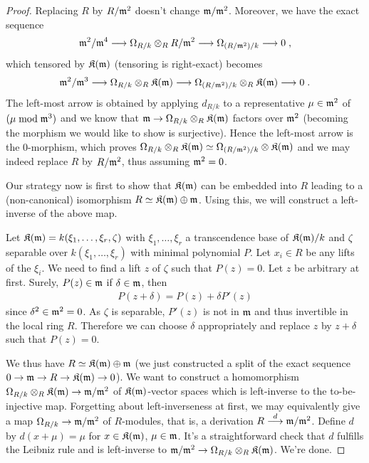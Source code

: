 \documentclass[a4paper,parskip=half,numbers=enddot, DIV=12]{scrreprt}
\begin{document}
\begin{proof}
	Replacing $R$ by $R/\mathfrak{m}^2$ doesn't change $\mathfrak{m}/\mathfrak{m}^2$. Moreover, we have the exact sequence
	\begin{align*}
		\mm^2/\mm^4\morphism\Omega_{R/k}\otimes_R R/\mm^2\morphism\Omega_{(R/\mm^2)/k}\morphism 0\;,
	\end{align*}
	which tensored by $\mathfrak{K}(\mathfrak{m})$ (tensoring is right-exact) becomes
	\begin{align*}
		\mm^2/\mm^3\morphism\Omega_{R/k}\otimes_R \KK(\mm)\morphism\Omega_{(R/\mm^2)/k}\otimes_R\KK(\mm)\morphism 0\;.
	\end{align*}
	The left-most arrow is obtained by applying $d_{R/k}$ to a representative $\mu\in\mathfrak{m}^2$ of $(\mu\bmod\mathfrak{m}^3)$ and we know that $\mm\morphism\Omega_{R/k}\otimes_R\KK(\mm)$ factors over $\mathfrak{m}^2$ (becoming the morphism we would like to show is surjective). Hence the left-most arrow is the $0$-morphism, which proves $\Omega_{R/k}\otimes_R \mathfrak{K}(\mathfrak{m})\simeq\Omega_{(R/\mathfrak{m}^2)/k}\otimes\mathfrak{K}(\mathfrak{m})$ and we may indeed replace $R$ by $R/\mathfrak{m}^2$, thus assuming $\mathfrak{m}^2=0$.
	
	Our strategy now is first to show that $\mathfrak{K}(\mathfrak{m})$ can be embedded into $R$ leading to a (non-canonical) isomorphism $R\simeq\mathfrak{K}(\mathfrak{m})\oplus\mathfrak{m}$. Using this, we will construct a left-inverse of the above map.
	
	Let $\mathfrak{K}(\mathfrak{m})=k(\xi_1,\ldots,\xi_r,\zeta)$ with $\xi_1,\ldots,\xi_r$ a transcendence base of $\mathfrak{K}(\mathfrak{m})/k$ and $\zeta$ separable over $k(\xi_1,\ldots,\xi_r)$ with minimal polynomial $P$. Let $x_i\in R$ be any lifts of the $\xi_i$. We need to find a lift $z$ of $\zeta$ such that $P(z)=0$. Let $z$ be arbitrary at first. Surely, $P(z)\in\mathfrak{m}$ if $\delta\in\mathfrak{m}$, then
	\begin{align*}
		P(z+\delta)=P(z)+\delta P'(z)
	\end{align*}
	since $\delta^2\in\mathfrak{m}^2=0$. As $\zeta$ is separable, $P'(z)$ is not in $\mathfrak{m}$ and thus invertible in the local ring $R$. Therefore we can choose $\delta$ appropriately and replace $z$ by $z+\delta$ such that $P(z)=0$.
	
	We thus have $R\simeq \mathfrak{K}(\mathfrak{m})\oplus\mathfrak{m}$ (we just constructed a split of the exact sequence $0\morphism \mm\morphism R\morphism\KK(\mm)\morphism 0$). We want to construct a homomorphism $\Omega_{R/k}\otimes_R\KK(\mm)\morphism\mm/\mm^2$ of $\mathfrak{K}(\mathfrak{m})$-vector spaces which is left-inverse to the to-be-injective map. Forgetting about left-inverseness at first, we may equivalently give a map $\Omega_{R/k}\morphism\mm/\mm^2$ of $R$-modules, that is, a derivation $R\morphism[d]\mm/\mm^2$. Define $d$ by $d(x+\mu)=\mu$ for $x\in\mathfrak{K}(\mathfrak{m})$, $\mu\in\mathfrak{m}$. It's a straightforward check that $d$ fulfills the Leibniz rule and is left-inverse to $\mm/\mm^2\morphism\Omega_{R/k}\otimes_R\KK(\mm)$. We're done.
\end{proof}
\end{document}

